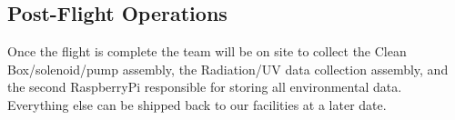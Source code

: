 \subsection{Post-Flight Operations}
Once the flight is complete the team will be on site to collect the Clean Box/solenoid/pump assembly, the Radiation/UV data collection assembly, and the second RaspberryPi responsible for storing all environmental data. Everything else can be shipped back to our facilities at a later date.  



